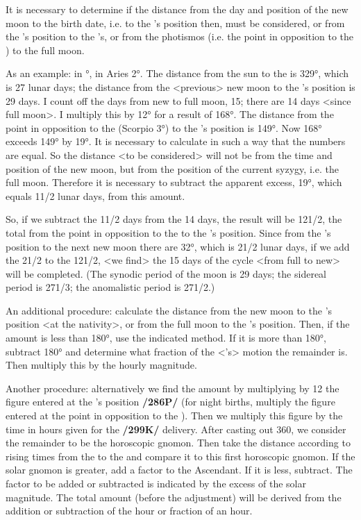 It is necessary to determine if the distance from the day and position of
the new moon to the birth date, i.e. to the \Moon’s position then, must be considered, or from the \Sun’s position to the \Moon’s, or from the photismos (i.e. the point in opposition to the \Sun) to the full moon.

As an example: \Sun\xspace in \Taurus\xspace 3°, \Moon\xspace in Aries 2°. The distance from the sun to the \Moon\xspace is 329°, which is 27 lunar days; the distance from the <previous> new moon to the \Moon’s position is 29 days. I count off the days from new to full moon, 15; there are 14 days <since full moon>. I multiply this by 12°
for a result of 168°. The distance from the point in opposition to the \Sun\xspace (Scorpio 3°) to the \Moon’s position is 149°. Now 168° exceeds 149° by 19°. It is necessary to calculate in such a way that the
numbers are equal. So the distance <to be considered> will not be from the time and position of the new moon, but from the position of the current syzygy, i.e. the full moon. Therefore it is necessary to subtract the apparent excess, 19°, which equals 11/2 lunar days, from this amount. 

So, if we subtract the 11/2 days from the 14 days, the result will be 121/2, the total from the point in opposition to the \Sun\xspace to the \Moon’s position. Since from the \Moon’s position to the next new moon there are 32°, which is 21/2 lunar days, if we add the 21/2 to the 121/2, <we find> the 15 days of the cycle <from full to new> will be completed. (The synodic period of the moon is 29 days; the sidereal period is 271/3; the anomalistic period is 271/2.)

An additional procedure: calculate the distance from the new moon to the \Moon’s position <at the nativity>, or from the full moon to the \Moon’s position. Then, if the amount is less than 180°, use the
indicated method. If it is more than 180°, subtract 180° and determine what fraction of the <\Moon’s> motion the remainder is. Then multiply this by the hourly magnitude.

Another procedure: alternatively we find the amount by multiplying by 12 the figure entered at the \Sun’s position \textbf{/286P/} (for night births, multiply the figure entered at the point in opposition to the \Sun). Then we multiply this figure by the time in hours given for the \textbf{/299K/} delivery. After casting out 360, we consider the remainder to be the horoscopic gnomon. Then take the distance according to rising times from the \Sun\xspace to the \Moon\xspace and compare it to this first horoscopic gnomon. If the solar gnomon is greater, add a factor to the Ascendant. If it is less, subtract. The factor to be added or subtracted is indicated by the excess of the solar magnitude. The total amount (before the adjustment) will be derived from the addition or subtraction of the hour or fraction of an hour.

\newpage